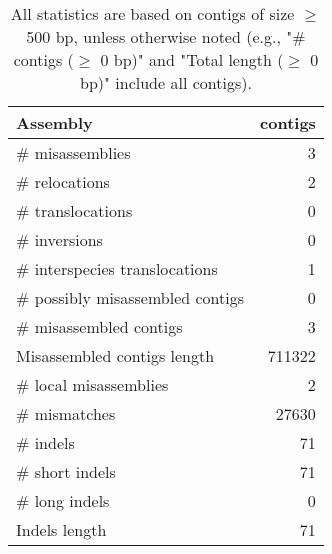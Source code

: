 \documentclass[12pt,a4paper]{article}
\begin{document}
\begin{table}[ht]
\begin{center}
\caption{All statistics are based on contigs of size $\geq$ 500 bp, unless otherwise noted (e.g., "\# contigs ($\geq$ 0 bp)" and "Total length ($\geq$ 0 bp)" include all contigs).}
\begin{tabular}{|l*{1}{|r}|}
\hline
Assembly & contigs \\ \hline
\# misassemblies & 3 \\ \hline
\hspace{5mm}\# relocations & 2 \\ \hline
\hspace{5mm}\# translocations & 0 \\ \hline
\hspace{5mm}\# inversions & 0 \\ \hline
\hspace{5mm}\# interspecies translocations & 1 \\ \hline
\# possibly misassembled contigs & 0 \\ \hline
\# misassembled contigs & 3 \\ \hline
Misassembled contigs length & 711322 \\ \hline
\# local misassemblies & 2 \\ \hline
\# mismatches & 27630 \\ \hline
\# indels & 71 \\ \hline
\hspace{5mm}\# short indels & 71 \\ \hline
\hspace{5mm}\# long indels & 0 \\ \hline
Indels length & 71 \\ \hline
\end{tabular}
\end{center}
\end{table}
\end{document}
